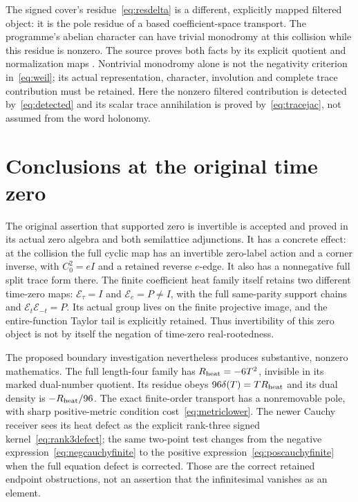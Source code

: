 \documentclass[11pt,a4paper]{article}
\theoremstyle{definition}\newtheorem{definition}[theorem]{Definition}\newtheorem{remark}[theorem]{Remark}
\begin{document}
The signed cover's residue~\eqref{eq:resdelta} is a different, explicitly mapped filtered object: it is the pole residue of a based coefficient-space transport. The programme's abelian character can have trivial monodromy at this collision while this residue is nonzero. The source proves both facts by its explicit quotient and normalization maps \cite{EHM,CBR}. Nontrivial monodromy alone is not the negativity criterion in~\eqref{eq:weil}; its actual representation, character, involution and complete trace contribution must be retained. Here the nonzero filtered contribution is detected by~\eqref{eq:detected} and its scalar trace annihilation is proved by~\eqref{eq:tracejac}, not assumed from the word holonomy.

\section{Conclusions at the original time zero}
The original assertion that supported zero is invertible is accepted and proved in its actual zero algebra and both semilattice adjunctions. It has a concrete effect: at the collision the full cyclic map has an invertible zero-label action and a corner inverse, with $C_0^2=eI$ and a retained reverse $e$-edge. It also has a nonnegative full split trace form there. The finite coefficient heat family itself retains two different time-zero maps: $\mathcal E_\tau=I$ and $\mathcal E_e=P\ne I$, with the full same-parity support chains and $\mathcal E_t\mathcal E_{-t}=P$. Its actual group lives on the finite projective image, and the entire-function Taylor tail is explicitly retained. Thus invertibility of this zero object is not by itself the negation of time-zero real-rootedness.

The proposed boundary investigation nevertheless produces substantive, nonzero mathematics. The full length-four family has $R_{\rm heat}=-6T^2$, invisible in its marked dual-number quotient. Its residue obeys $96\delta(T)=TR_{\rm heat}$ and its dual density is $-R_{\rm heat}/96$. The exact finite-order transport has a nonremovable pole, with sharp positive-metric condition cost~\eqref{eq:metriclower}. The newer Cauchy receiver sees its heat defect as the explicit rank-three signed kernel~\eqref{eq:rank3defect}; the same two-point test changes from the negative expression~\eqref{eq:negcauchyfinite} to the positive expression~\eqref{eq:poscauchyfinite} when the full equation defect is corrected. Those are the correct retained endpoint obstructions, not an assertion that the infinitesimal vanishes as an element.
\end{document}
